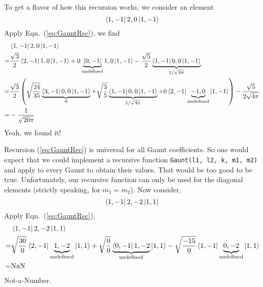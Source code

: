 To get a flavor of how this recursion works, we consider an element
\begin{equation*}
\Bra{1,-1} 2,0 \Ket{1,-1}
\end{equation*}
Apply Eqn.~(\ref{eq:GauntRec}), we find
\begin{align}
& \Bra{1,-1} 2,0 \Ket{1,-1} \nonumber \\
= & {} \frac{\sqrt{3}}{2} \Bra{2,-1} 1,0 \Ket{1,-1}
+ 0 \underbrace{\Bra{0,-1}}_{\text{undefined}} 1,0 \Ket{1,-1}
- \frac{\sqrt{5}}{2} \underbrace{\Bra{1,-1} 0,0 \Ket{1,-1}}_{1/\sqrt{4\pi}} \nonumber \\
= & {} \frac{\sqrt{3}}{2} \left(
\sqrt{\frac{24}{35}}\underbrace{\Bra{3,-1} 0,0 \Ket{1,-1}}_{0}
+ \sqrt{\frac{3}{5}}\underbrace{\Bra{1,-1} 0,0 \Ket{1,-1}}_{1/\sqrt{4\pi}}
+ 0\Bra{2,-1} \underbrace{-1,0}_{\text{undefined}} \Ket{1,-1} \right) - \frac{\sqrt{5}}{2\sqrt{4\pi}} \nonumber \\
= & {} -\frac{1}{\sqrt{20\pi}}
\end{align}
Yeah, we found it!

Recursion (\ref{eq:GauntRec}) is universal for all Gaunt coefficients. So one
would expect that we could implement a recursive function
\texttt{Gaunt(l1, l2, k, m1, m2)}
and apply to every Gaunt to obtain their values. That would be too good
to be true. Unfortunately, our recursive function can only be used
for the diagonal elements (strictly speaking, for $m_1=m_2$).
Now consider,
\begin{equation*}
\Bra{1,-1} 2,-2 \Ket{1,1}
\end{equation*}
Apply Eqn.~(\ref{eq:GauntRec}),
\begin{align}
& \Bra{1,-1} 2,-2 \Ket{1,1} \nonumber \\
= & {} \sqrt{\frac{30}{0}} \Bra{2,-1} \underbrace{1,-2}_{\text{undefined}} \Ket{1,1}
+ \sqrt{\frac{0}{0}} \underbrace{\Bra{0,-1} 1,-2}_{\text{undefined}} \Ket{1,1}
- \sqrt{\frac{-15}{0}} \Bra{1,-1} \underbrace{0,-2}_{\text{undefined}} \Ket{1,1} \nonumber \\
= & {} \text{NaN}
\end{align}
Not-a-Number.

